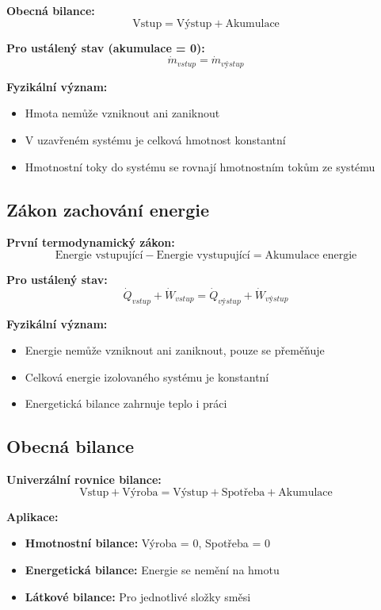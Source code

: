 \documentclass[11pt,a4paper]{article}
\begin{document}
\textbf{Obecná bilance:}
\[\text{Vstup} = \text{Výstup} + \text{Akumulace}\]

\textbf{Pro ustálený stav (akumulace = 0):}
\[\dot{m}_{vstup} = \dot{m}_{výstup}\]

\textbf{Fyzikální význam:}
\begin{itemize}
\item Hmota nemůže vzniknout ani zaniknout
\item V uzavřeném systému je celková hmotnost konstantní
\item Hmotnostní toky do systému se rovnají hmotnostním tokům ze systému
\end{itemize}

\subsection{Zákon zachování energie}

\textbf{První termodynamický zákon:}
\[\text{Energie vstupující} - \text{Energie vystupující} = \text{Akumulace energie}\]

\textbf{Pro ustálený stav:}
\[\dot{Q}_{vstup} + \dot{W}_{vstup} = \dot{Q}_{výstup} + \dot{W}_{výstup}\]

\textbf{Fyzikální význam:}
\begin{itemize}
\item Energie nemůže vzniknout ani zaniknout, pouze se přeměňuje
\item Celková energie izolovaného systému je konstantní
\item Energetická bilance zahrnuje teplo i práci
\end{itemize}

\subsection{Obecná bilance}

\textbf{Univerzální rovnice bilance:}
\[\text{Vstup} + \text{Výroba} = \text{Výstup} + \text{Spotřeba} + \text{Akumulace}\]

\textbf{Aplikace:}
\begin{itemize}
\item \textbf{Hmotnostní bilance:} Výroba = 0, Spotřeba = 0
\item \textbf{Energetická bilance:} Energie se nemění na hmotu
\item \textbf{Látkové bilance:} Pro jednotlivé složky směsi
\end{itemize}

\clearpage
\end{document}
